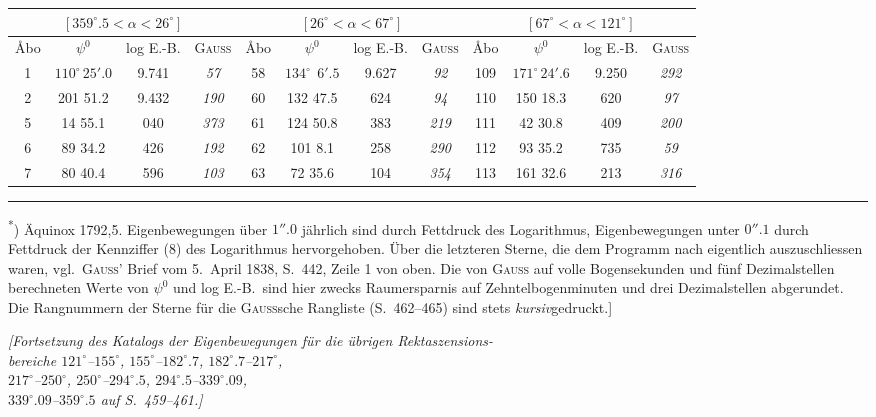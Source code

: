 \documentclass[12pt,a4paper]{article}
\theoremstyle{plain}
\theoremstyle{definition}
\theoremstyle{remark}
\begin{document}
\begin{small}
\begin{center}
\begin{tabular}{|c|c|c|c||c|c|c|c||c|c|c|c|}
\hline
\multicolumn{4}{|c||}{$[359^{\circ}\!.5 < \alpha < 26^{\circ}]$} &
\multicolumn{4}{c||}{$[26^{\circ} < \alpha < 67^{\circ}]$} &
\multicolumn{4}{c|}{$[67^{\circ} < \alpha < 121^{\circ}]$} \\
\hline
\AA bo & $\psi^{0}$ & log E.-B. & \textsc{Gau\ss} &
\AA bo & $\psi^{0}$ & log E.-B. & \textsc{Gau\ss} &
\AA bo & $\psi^{0}$ & log E.-B. & \textsc{Gau\ss} \\
\hline
 1 & $110^{\circ}\,25'\!.0$ & 9.741 & \textit{57} &
58 & $134^{\circ}\;\,6'\!.5$ & 9.627 & \textit{92} &
109 & $171^{\circ}\,24'\!.6$ & 9.250 & \textit{292} \\
 2 & 201 51.2 & 9.432 & \textit{190} &
60 & 132 47.5 & 624 & \textit{94} &
110 & 150 18.3 & 620 & \textit{97} \\
 5 & 14 55.1 & 040 & \textit{373} &
61 & 124 50.8 & 383 & \textit{219} &
111 & 42 30.8 & 409 & \textit{200} \\
 6 & 89 34.2 & 426 & \textit{192} &
62 & 101 \phantom{0}8.1 & 258 & \textit{290} &
112 & 93 35.2 & 735 & \textit{59} \\
 7 & 80 40.4 & 596 & \textit{103} &
63 & 72 35.6 & 104 & \textit{354} &
113 & 161 32.6 & 213 & \textit{316} \\
\hline
\end{tabular}
\end{center}
\end{small}

\medskip
\noindent\rule{\textwidth}{0.4pt}
\begin{footnotesize}
\textsuperscript{*}) \"Aquinox 1792,5. Eigenbewegungen \"uber $1''\!\!.0$ j\"ahrlich sind durch Fettdruck des
Logarithmus, Eigenbewegungen unter $0''\!\!.1$ durch Fettdruck der Kennziffer (8) des
Logarithmus hervorgehoben. \"Uber die letzteren Sterne, die dem Programm nach
eigentlich auszuschliessen waren, vgl.~\textsc{Gau\ss'} Brief vom 5.~April 1838, S.~442,
Zeile 1 von oben. Die von \textsc{Gau\ss} auf volle Bogensekunden und f\"unf Dezimalstellen
berechneten Werte von $\psi^{0}$ und log E.-B.~sind hier zwecks Raumersparnis auf
Zehntelbogenminuten und drei Dezimalstellen abgerundet. Die Rangnummern der
Sterne f\"ur die \textsc{Gau\ss}sche Rangliste (S.~462--465) sind stets \textit{kursiv}gedruckt.]
\end{footnotesize}

\newpage
\begin{center}
\textit{[Fortsetzung des Katalogs der Eigenbewegungen f\"ur die \"ubrigen Rektaszensions-\\
bereiche $121^{\circ}$--$155^{\circ}$, $155^{\circ}$--$182^{\circ}\!.7$, $182^{\circ}\!.7$--$217^{\circ}$,\\
$217^{\circ}$--$250^{\circ}$, $250^{\circ}$--$294^{\circ}\!.5$, $294^{\circ}\!.5$--$339^{\circ}\!.09$,\\
$339^{\circ}\!.09$--$359^{\circ}\!.5$ auf S.~459--461.]}
\end{center}
\end{document}
